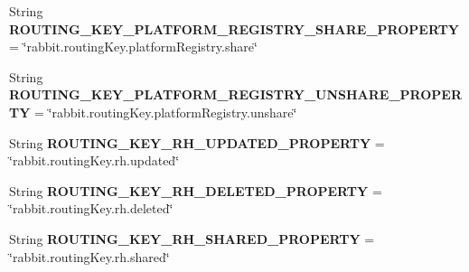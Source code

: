\begin{DoxyCompactItemize}
\item 
\mbox{\label{interfaceeu_1_1h2020_1_1symbiote_1_1util_1_1RabbitConstants_a0c15383b05acf38bf43dc26e74e41d0f}} 
String {\bfseries R\+O\+U\+T\+I\+N\+G\+\_\+\+K\+E\+Y\+\_\+\+P\+L\+A\+T\+F\+O\+R\+M\+\_\+\+R\+E\+G\+I\+S\+T\+R\+Y\+\_\+\+S\+H\+A\+R\+E\+\_\+\+P\+R\+O\+P\+E\+R\+TY} = \char`\"{}rabbit.\+routing\+Key.\+platform\+Registry.\+share\char`\"{}
\item 
\mbox{\label{interfaceeu_1_1h2020_1_1symbiote_1_1util_1_1RabbitConstants_a985b31d2aff145d6cd48c8b42ff7f598}} 
String {\bfseries R\+O\+U\+T\+I\+N\+G\+\_\+\+K\+E\+Y\+\_\+\+P\+L\+A\+T\+F\+O\+R\+M\+\_\+\+R\+E\+G\+I\+S\+T\+R\+Y\+\_\+\+U\+N\+S\+H\+A\+R\+E\+\_\+\+P\+R\+O\+P\+E\+R\+TY} = \char`\"{}rabbit.\+routing\+Key.\+platform\+Registry.\+unshare\char`\"{}
\item 
\mbox{\label{interfaceeu_1_1h2020_1_1symbiote_1_1util_1_1RabbitConstants_a1a82e9e36cdaa9428de8be64c7a8d416}} 
String {\bfseries R\+O\+U\+T\+I\+N\+G\+\_\+\+K\+E\+Y\+\_\+\+R\+H\+\_\+\+U\+P\+D\+A\+T\+E\+D\+\_\+\+P\+R\+O\+P\+E\+R\+TY} = \char`\"{}rabbit.\+routing\+Key.\+rh.\+updated\char`\"{}
\item 
\mbox{\label{interfaceeu_1_1h2020_1_1symbiote_1_1util_1_1RabbitConstants_ac46c931723a1e9e8be56811374f6e9f7}} 
String {\bfseries R\+O\+U\+T\+I\+N\+G\+\_\+\+K\+E\+Y\+\_\+\+R\+H\+\_\+\+D\+E\+L\+E\+T\+E\+D\+\_\+\+P\+R\+O\+P\+E\+R\+TY} = \char`\"{}rabbit.\+routing\+Key.\+rh.\+deleted\char`\"{}
\item 
\mbox{\label{interfaceeu_1_1h2020_1_1symbiote_1_1util_1_1RabbitConstants_ac04c4a4bc3ab3ede58fc44670b03f8c1}} 
String {\bfseries R\+O\+U\+T\+I\+N\+G\+\_\+\+K\+E\+Y\+\_\+\+R\+H\+\_\+\+S\+H\+A\+R\+E\+D\+\_\+\+P\+R\+O\+P\+E\+R\+TY} = \char`\"{}rabbit.\+routing\+Key.\+rh.\+shared\char`\"{}
\item 
\mbox{\label{interfaceeu_1_1h2020_1_1symbiote_1_1util_1_1RabbitConstants_a4a2ab1efedf291598f09d49cb716b7d7}} 

\end{DoxyCompactItemize}
